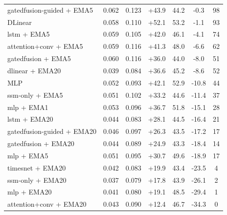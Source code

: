 {\begin{tabular}{lcccccc}
gatedfusion-guided + EMA5 & 0.062 & 0.123 & +43.9 & 44.2 & -0.3 & 98 \\
DLinear & 0.058 & 0.110 & +52.1 & 53.2 & -1.1 & 93 \\
lstm + EMA5 & 0.059 & 0.105 & +42.0 & 46.1 & -4.1 & 74 \\
attention+conv + EMA5 & 0.059 & 0.116 & +41.3 & 48.0 & -6.6 & 62 \\
gatedfusion + EMA5 & 0.060 & 0.116 & +36.0 & 44.0 & -8.0 & 51 \\
dlinear + EMA20 & 0.039 & 0.084 & +36.6 & 45.2 & -8.6 & 52 \\
MLP & 0.052 & 0.093 & +42.1 & 52.9 & -10.8 & 44 \\
ssm-only + EMA5 & 0.051 & 0.102 & +33.2 & 44.6 & -11.4 & 37 \\
mlp + EMA1 & 0.053 & 0.096 & +36.7 & 51.8 & -15.1 & 28 \\
lstm + EMA20 & 0.044 & 0.083 & +28.1 & 44.5 & -16.4 & 21 \\
gatedfusion-guided + EMA20 & 0.046 & 0.097 & +26.3 & 43.5 & -17.2 & 17 \\
gatedfusion + EMA20 & 0.044 & 0.089 & +24.9 & 43.3 & -18.4 & 14 \\
mlp + EMA5 & 0.051 & 0.095 & +30.7 & 49.6 & -18.9 & 17 \\
timesnet + EMA20 & 0.042 & 0.083 & +19.9 & 43.4 & -23.5 & 4 \\
ssm-only + EMA20 & 0.037 & 0.079 & +17.8 & 43.9 & -26.1 & 2 \\
mlp + EMA20 & 0.041 & 0.080 & +19.1 & 48.5 & -29.4 & 1 \\
attention+conv + EMA20 & 0.043 & 0.090 & +12.4 & 46.7 & -34.3 & 0 \\
\bottomrule
\end{tabular}
}

